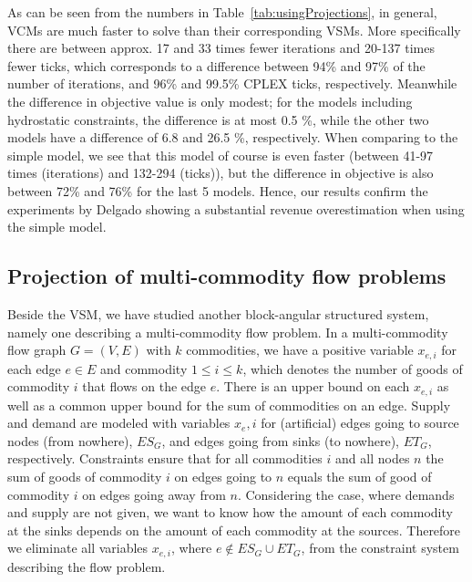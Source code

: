 \documentclass[citeauthoryear]{llncs}
\newcommand{\mi}{\mathit}
\begin{document}
As can be seen from the numbers in Table~\ref{tab:usingProjections}, in general, VCMs are much faster to solve than their corresponding VSMs. More specifically there are between approx. 17 and 33 times fewer iterations and 20-137 times fewer ticks, which corresponds to a difference between 94\% and 97\% of the number of iterations, and 96\% and 99.5\% CPLEX ticks, respectively. Meanwhile the difference in objective value is only modest; for the models including hydrostatic constraints, the difference is at most 0.5 \%, while the other two models have a difference of 6.8 and 26.5 \%, respectively. 
When comparing to the simple model, we see that this model of course is even faster (between 41-97 times (iterations) and 132-294 (ticks)), but the difference in objective is also between 72\% and 76\% for the last 5 models. Hence, our results confirm the experiments by Delgado \cite{AlbertosThesis} showing a substantial revenue overestimation when using the simple model. 

\subsection{Projection of multi-commodity flow problems}
Beside the VSM, we have studied another block-angular structured system, namely one describing a multi-commodity flow problem. In a multi-commodity flow graph $G=(V,E)$ with $k$ commodities, we have a positive variable $x_{e,i}$ for each edge $e\in E$ and commodity $1\leq i\leq k$, which denotes the number of goods of commodity $i$ that flows on the edge $e$. There is an upper bound on each $x_{e,i}$ as well as a common upper bound for the sum of commodities on an edge. 
Supply and demand are modeled with variables $x_e,i$ for (artificial) edges going to source nodes (from nowhere), $\mi{ES}_G$, and edges going from sinks (to nowhere), $\mi{ET}_G$, respectively. 
Constraints ensure that for all commodities $i$ and all nodes $n$ %
the sum of goods of commodity $i$ on edges going to $n$ equals the sum of good of commodity $i$ on edges going away from $n$. Considering the case, where demands and supply are not given, we want to know how the amount of each commodity at the sinks depends on the amount of each commodity at the sources. Therefore we eliminate all variables $x_{e,i}$, where $e\notin \mi{ES}_G\cup \mi{ET}_G$, from the constraint system describing the flow problem. 
\end{document}
